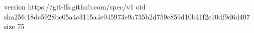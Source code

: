 version https://git-lfs.github.com/spec/v1
oid sha256:18dc5928bc05a4c3115a4e945973e9a735b2d759c859d10b41f2c10df9d6d407
size 75
